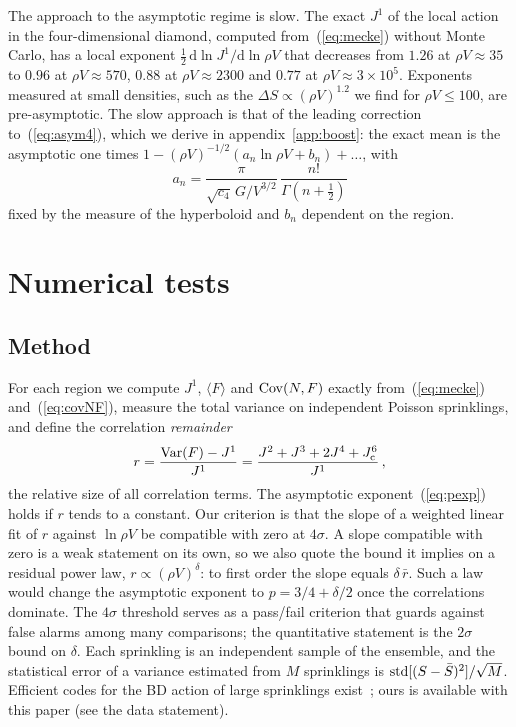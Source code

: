 \documentclass{iopjournal}
\newcommand{\eref}[1]{(\ref{#1})}
\newcommand{\rmd}{\mathrm{d}}
\newcommand{\rhoV}{\rho V}
\newcommand{\Jone}{J^{1}}
\begin{document}
The approach to the asymptotic regime is slow. The exact $\Jone$ of the local
action in the four-dimensional diamond, computed from~\eref{eq:mecke} without
Monte Carlo, has a local exponent $\frac12\,\rmd\ln\Jone/\rmd\ln\rhoV$ that
decreases from $1.26$ at $\rhoV\approx35$ to $0.96$ at $\rhoV\approx570$,
$0.88$ at $\rhoV\approx2300$ and $0.77$ at $\rhoV\approx3\times10^5$.
Exponents measured at small densities, such as the $\Delta S\propto
(\rhoV)^{1.2}$ we find for $\rhoV\le100$, are pre-asymptotic. The
slow approach is that of the leading correction to~\eref{eq:asym4}, which we
derive in appendix~\ref{app:boost}: the exact mean is the asymptotic one
times $1-(\rhoV)^{-1/2}(a_n\ln\rhoV+b_n)+\dots$, with
\begin{equation}
a_n=\frac{\pi}{\sqrt{c_4}\,G/V^{3/2}}\,\frac{n!}{\Gamma(n+\frac12)}
\label{eq:corr}
\end{equation}
fixed by the measure of the hyperboloid and $b_n$ dependent on the region.

\section{Numerical tests}
\label{sec:numerics}

\subsection{Method}

For each region we compute $\Jone$, $\langle F\rangle$ and ${\rm Cov}(N,F)$
exactly from~\eref{eq:mecke} and~\eref{eq:covNF}, measure the total variance
on independent Poisson sprinklings, and define the correlation
\emph{remainder}
\begin{equation}
r=\frac{{\rm Var}(F)-\Jone}{\Jone}
=\frac{J^2+J^3+2J^4+J^6_{\rm c}}{\Jone}\,,
\label{eq:rest}
\end{equation}
the relative size of all correlation terms. The asymptotic
exponent~\eref{eq:pexp} holds if $r$ tends to a constant. Our criterion is
that the slope of a weighted linear fit of $r$ against $\ln\rhoV$ be
compatible with zero at $4\sigma$. A slope compatible with zero is a weak
statement on its own, so we also quote the bound it implies on a residual
power law, $r\propto(\rhoV)^\delta$: to first order the slope equals
$\delta\,\bar r$. Such a law would change the asymptotic exponent to
$p=3/4+\delta/2$ once the correlations dominate. The $4\sigma$ threshold
serves as a pass/fail criterion that guards against false alarms among many
comparisons; the quantitative statement is the $2\sigma$ bound on $\delta$.
Each sprinkling is an independent sample of the ensemble, and the statistical
error of a variance estimated from $M$ sprinklings is
${\rm std}[(S-\bar S)^2]/\sqrt M$. Efficient codes for the BD action of large
sprinklings exist~\cite{Cunningham2018}; ours is available with this paper
(see the data statement).
\end{document}
